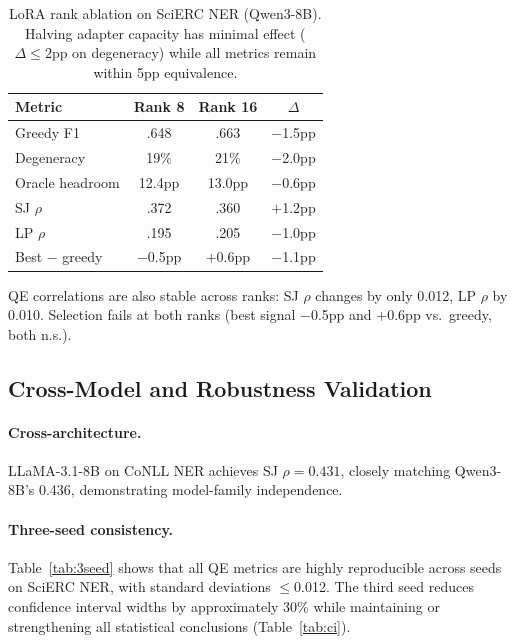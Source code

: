 \documentclass[11pt,twocolumn]{article}
\begin{document}
\begin{table}[t]
\centering
\small
\caption{LoRA rank ablation on SciERC NER (Qwen3-8B). Halving adapter capacity has minimal effect ($\Delta{\leq}2$pp on degeneracy) while all metrics remain within 5pp equivalence.}
\label{tab:lora}
\begin{tabular}{@{}l ccc@{}}
\toprule
Metric & Rank 8 & Rank 16 & $\Delta$ \\
\midrule
Greedy F1      & .648 & .663 & $-$1.5pp \\
Degeneracy     & 19\% & 21\% & $-$2.0pp \\
Oracle headroom & 12.4pp & 13.0pp & $-$0.6pp \\
SJ $\rho$      & .372 & .360 & $+$1.2pp \\
LP $\rho$      & .195 & .205 & $-$1.0pp \\
Best $-$ greedy & $-$0.5pp & $+$0.6pp & $-$1.1pp \\
\bottomrule
\end{tabular}
\end{table}

QE correlations are also stable across ranks: SJ $\rho$ changes by only 0.012, LP $\rho$ by 0.010.
Selection fails at both ranks (best signal $-$0.5pp and $+$0.6pp vs.\ greedy, both n.s.).

\subsection{Cross-Model and Robustness Validation}
\label{sec:robustness}

\paragraph{Cross-architecture.}
LLaMA-3.1-8B on CoNLL NER achieves SJ $\rho{=}0.431$, closely matching Qwen3-8B's 0.436, demonstrating model-family independence.

\paragraph{Three-seed consistency.}
Table~\ref{tab:3seed} shows that all QE metrics are highly reproducible across seeds on SciERC NER, with standard deviations $\leq$0.012.
The third seed reduces confidence interval widths by approximately 30\% while maintaining or strengthening all statistical conclusions (Table~\ref{tab:ci}).
\end{document}
